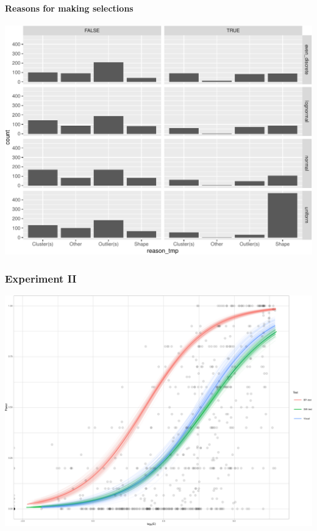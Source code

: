 \documentclass[]{interact}
\theoremstyle{plain}%
\theoremstyle{definition}
\theoremstyle{remark}
\begin{document}
\hypertarget{reasons-for-making-selections}{%
\paragraph{Reasons for making
selections}\label{reasons-for-making-selections}}

\includegraphics[width=1\linewidth]{paper_comparison_files/figure-latex/unnamed-chunk-13-1}

\hypertarget{experiment-ii}{%
\subsubsection{Experiment II}\label{experiment-ii}}

\includegraphics[width=1\linewidth]{paper_comparison_files/figure-latex/unnamed-chunk-16-1}
\end{document}
